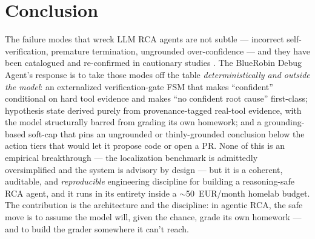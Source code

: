 \documentclass[11pt]{article}
\begin{document}
\section{Conclusion}

The failure modes that wreck LLM RCA agents are not subtle --- incorrect
self-verification, premature termination, ungrounded over-confidence --- and
they have been catalogued \citep{cemri2025mast} and re-confirmed in cautionary
studies \citep{anon2026cautionary}. The BlueRobin Debug Agent's response is to
take those modes off the table \emph{deterministically and outside the model}:
an externalized verification-gate FSM that makes ``confident'' conditional on
hard tool evidence and makes ``no confident root cause'' first-class;
hypothesis state derived purely from provenance-tagged real-tool evidence,
with the model structurally barred from grading its own homework; and a
grounding-based soft-cap that pins an ungrounded or thinly-grounded conclusion
below the action tiers that would let it propose code or open a PR. None of
this is an empirical breakthrough --- the localization benchmark is admittedly
oversimplified and the system is advisory by design --- but it is a coherent,
auditable, and \emph{reproducible} engineering discipline for building a
reasoning-safe RCA agent, and it runs in its entirety inside a
$\sim$50~EUR/month homelab budget. The contribution is the architecture and
the discipline: in agentic RCA, the safe move is to assume the model will,
given the chance, grade its own homework --- and to build the grader somewhere
it can't reach.



\end{document}
